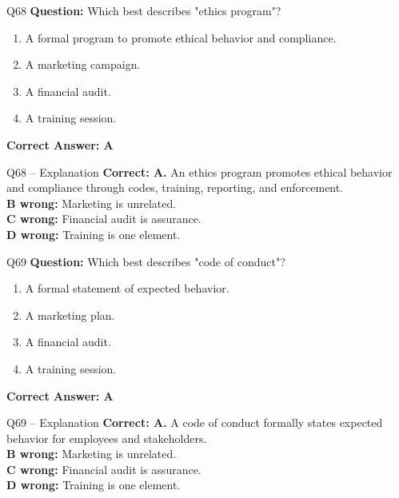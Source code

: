 \documentclass[aspectratio=169,10pt]{beamer}
\begin{document}
	\begin{frame}[t]{Q68}
		\small
		\textbf{Question:} Which best describes "ethics program"?
		\begin{enumerate}[label=\Alph*.,itemsep=1pt,topsep=2pt]
			\item A formal program to promote ethical behavior and compliance.
			\item A marketing campaign.
			\item A financial audit.
			\item A training session.
		\end{enumerate}
		\vspace{4pt}
		\textbf{Correct Answer: A}
	\end{frame}
	
	\begin{frame}[t]{Q68 -- Explanation}
		\small
		\textbf{Correct: A.} An ethics program promotes ethical behavior and compliance through codes, training, reporting, and enforcement. \\[4pt]
		\textbf{B wrong:} Marketing is unrelated. \\[2pt]
		\textbf{C wrong:} Financial audit is assurance. \\[2pt]
		\textbf{D wrong:} Training is one element.
	\end{frame}
	
	\begin{frame}[t]{Q69}
		\small
		\textbf{Question:} Which best describes "code of conduct"?
		\begin{enumerate}[label=\Alph*.,itemsep=1pt,topsep=2pt]
			\item A formal statement of expected behavior.
			\item A marketing plan.
			\item A financial audit.
			\item A training session.
		\end{enumerate}
		\vspace{4pt}
		\textbf{Correct Answer: A}
	\end{frame}
	
	\begin{frame}[t]{Q69 -- Explanation}
		\small
		\textbf{Correct: A.} A code of conduct formally states expected behavior for employees and stakeholders. \\[4pt]
		\textbf{B wrong:} Marketing is unrelated. \\[2pt]
		\textbf{C wrong:} Financial audit is assurance. \\[2pt]
		\textbf{D wrong:} Training is one element.
	\end{frame}
	
\end{document}
